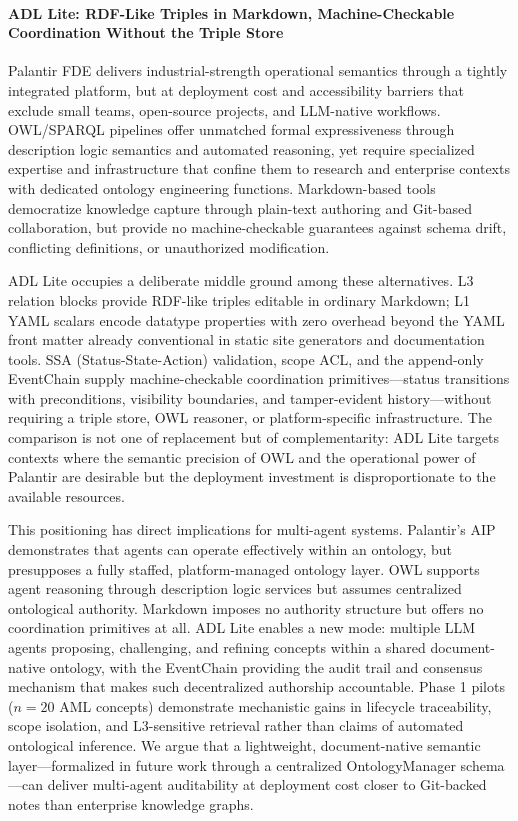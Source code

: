 \paragraph{ADL Lite: RDF-Like Triples in Markdown, Machine-Checkable Coordination Without the Triple Store}\label{adl-lite-rdf-like-triples-in-markdown-machine-checkable-coordination-without-the-triple-store}

Palantir FDE delivers industrial-strength operational semantics through a tightly integrated platform, but at deployment cost and accessibility barriers that exclude small teams, open-source projects, and LLM-native workflows. OWL/SPARQL pipelines offer unmatched formal expressiveness through description logic semantics and automated reasoning, yet require specialized expertise and infrastructure that confine them to research and enterprise contexts with dedicated ontology engineering functions. Markdown-based tools democratize knowledge capture through plain-text authoring and Git-based collaboration, but provide no machine-checkable guarantees against schema drift, conflicting definitions, or unauthorized modification.

ADL Lite occupies a deliberate middle ground among these alternatives. L3 relation blocks provide RDF-like triples editable in ordinary Markdown; L1 YAML scalars encode datatype properties with zero overhead beyond the YAML front matter already conventional in static site generators and documentation tools. SSA (Status-State-Action) validation, scope ACL, and the append-only EventChain supply machine-checkable coordination primitives---status transitions with preconditions, visibility boundaries, and tamper-evident history---without requiring a triple store, OWL reasoner, or platform-specific infrastructure. The comparison is not one of replacement but of complementarity: ADL Lite targets contexts where the semantic precision of OWL and the operational power of Palantir are desirable but the deployment investment is disproportionate to the available resources.

This positioning has direct implications for multi-agent systems. Palantir's AIP demonstrates that agents can operate effectively within an ontology, but presupposes a fully staffed, platform-managed ontology layer\cite{ref21}. OWL supports agent reasoning through description logic services but assumes centralized ontological authority. Markdown imposes no authority structure but offers no coordination primitives at all. ADL Lite enables a new mode: multiple LLM agents proposing, challenging, and refining concepts within a shared document-native ontology, with the EventChain providing the audit trail and consensus mechanism that makes such decentralized authorship accountable. Phase 1 pilots (\(n=20\) AML concepts) demonstrate mechanistic gains in lifecycle traceability, scope isolation, and L3-sensitive retrieval rather than claims of automated ontological inference. We argue that a lightweight, document-native semantic layer---formalized in future work through a centralized OntologyManager schema---can deliver multi-agent auditability at deployment cost closer to Git-backed notes than enterprise knowledge graphs.

